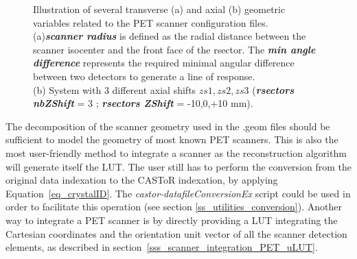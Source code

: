 \documentclass[a4paper, 11pt]{article}
\begin{document}
\begin{figure} [h!]
  \centerline
  {
    \hspace{0.1\textwidth}
  }
  \caption
  {
    Illustration of several transverse (a) and axial (b) geometric variables related to the PET scanner configuration files. \\
    (a)\textbf{\textit{scanner radius}} is defined as the radial distance between the scanner isocenter and the front face of the rsector. 
    The \textbf{\textit{min angle difference}} represents the required minimal angular difference between two detectors to generate a line of response. \\
    (b) System with 3 different axial shifts $zs1, zs2, zs3$ (\textbf{\textit{rsectors nbZShift}} = 3 ; \textbf{\textit{rsectors ZShift}} = -10,0,+10 mm).
  }
  \label{fig_scanner_fields}
\end{figure}

The decomposition of the scanner geometry used in the .geom files should be sufficient to model the geometry of most known PET scanners. 
This is also the most user-friendly method to integrate a scanner as the reconstruction algorithm will generate itself the LUT. 
The user still has to perform the conversion from the original data indexation to the CASToR indexation, by applying Equation~\ref{eq_crystalID}. 
The \textit{castor-datafileConversionEx} script could be used in order to facilitate this operation (see section \ref{ss_utilities_conversion}).
Another way to integrate a PET scanner is by directly providing a LUT integrating the Cartesian coordinates and the orientation unit vector of all
the scanner detection elements, as described in section~\ref{sss_scanner_integration_PET_uLUT}.
\end{document}
